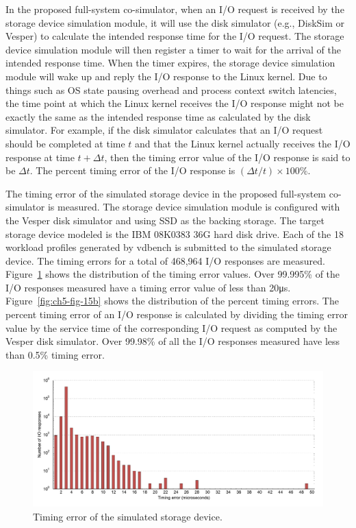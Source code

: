 In the proposed full-system co-simulator, when an I/O request is received by the storage device simulation module, it will use the disk simulator (e.g., DiskSim or Vesper) to calculate the intended response time for the I/O request. The storage device simulation module will then register a timer to wait for the arrival of the intended response time. When the timer expires, the storage device simulation module will wake up and reply the I/O response to the Linux kernel. Due to things such as OS state pausing overhead and process context switch latencies, the time point at which the Linux kernel receives the I/O response might not be exactly the same as the intended response time as calculated by the disk simulator. For example, if the disk simulator calculates that an I/O request should be completed at time $t$ and that the Linux kernel actually receives the I/O response at time $t + \Delta t$, then the timing error value of the I/O response is said to be $\Delta t$. The percent timing error of the I/O response is $(\Delta t / t) \times 100\%$. 

The timing error of the simulated storage device in the proposed full-system co-simulator is measured. The storage device simulation module is configured with the Vesper disk simulator and using SSD as the backing storage. The target storage device modeled is the IBM 08K0383 36G hard disk drive. Each of the 18 workload profiles generated by vdbench is submitted to the simulated storage device. The timing errors for a total of 468,964 I/O responses are measured. Figure~\ref{fig:ch5-fig-15a} shows the distribution of the timing error values. Over 99.995\% of the I/O responses measured have a timing error value of less than 20\si{\micro\second}. Figure~\ref{fig:ch5-fig-15b} shows the distribution of the percent timing errors. The percent timing error of an I/O response is calculated by dividing the timing error value by the service time of the corresponding I/O request as computed by the Vesper disk simulator. Over 99.98\% of all the I/O responses measured have less than 0.5\% timing error.

\begin{figure}[htpb]
	\centering
	\includegraphics[width=\textwidth]{figures/ch5-fig-15a.pdf}
	\caption{\label{fig:ch5-fig-15a}Timing error of the simulated storage device.}
\end{figure}

